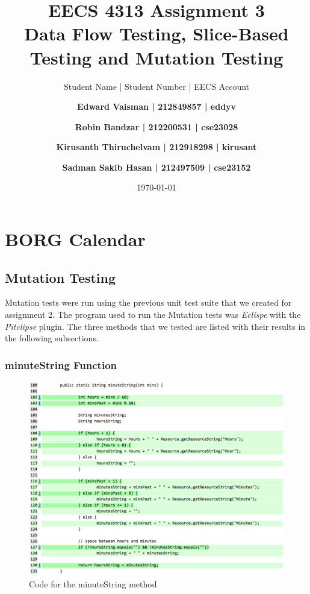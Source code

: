 \documentclass[fontsize=12pt,paper=letter,twoside]{scrartcl}
\author{Student Name | Student Number | EECS Account
\and \textbf{Edward Vaisman | 212849857 | eddyv}
\and \textbf{Robin Bandzar | 212200531 | cse23028}
\and \textbf{Kirusanth Thiruchelvam | 212918298 | kirusant}
\and \textbf{Sadman Sakib Hasan | 212497509 | cse23152}
}
\date{\today} %
\begin{document}
\title{EECS 4313 Assignment 3 \\Data Flow Testing, Slice-Based Testing and Mutation Testing}
\maketitle

\newpage

\tableofcontents


\newpage


\section{BORG Calendar}

\subsection{Mutation Testing}
Mutation tests were run using the previous unit test suite that we created for assignment 2. The program used to run the Mutation tests was \emph{Eclispe} with the \emph{Pitclipse} plugin. The three methods that we tested are listed with their results in the following subsections. 

\subsubsection{minuteString Function}


\begin{figure}[!htb]
\begin{center}
\includegraphics[width=.99\textwidth]{images/MutationTesting/minuteStringCode.png}
\end{center}
\caption{Code for the minuteString method}
\label{fig:minuteStringCode}
\end{figure}
\end{document}
